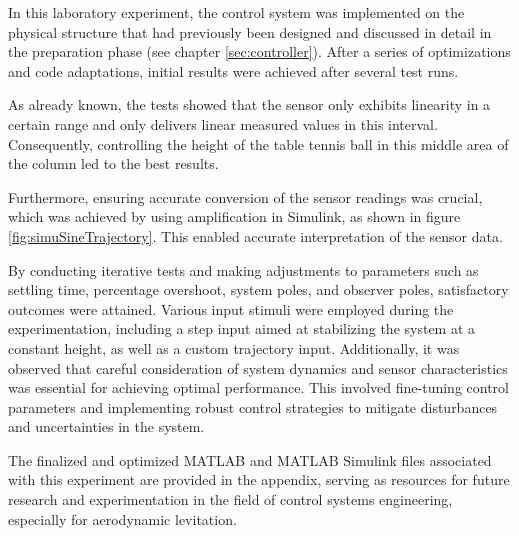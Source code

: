 

In this laboratory experiment, the control system was implemented on the physical structure that had previously been designed and discussed in detail in the preparation phase (see chapter \ref{sec:controller}). After a series of optimizations and code adaptations, initial results were achieved after several test runs.

As already known, the tests showed that the sensor only exhibits linearity in a certain range and only delivers linear measured values in this interval. Consequently, controlling the height of the table tennis ball in this middle area of the column led to the best results.

Furthermore, ensuring accurate conversion of the sensor readings was crucial, which was achieved by using amplification in Simulink, as shown in figure \ref{fig:simuSineTrajectory}. This enabled accurate interpretation of the sensor data.

By conducting iterative tests and making adjustments to parameters such as settling time, percentage overshoot, system poles, and observer poles, satisfactory outcomes were attained. Various input stimuli were employed during the experimentation, including a step input aimed at stabilizing the system at a constant height, as well as a custom trajectory input. 
Additionally, it was observed that careful consideration of system dynamics and sensor characteristics was essential for achieving optimal performance. This involved fine-tuning control parameters and implementing robust control strategies to mitigate disturbances and uncertainties in the system.

The finalized and optimized MATLAB and MATLAB Simulink files associated with this experiment are provided in the appendix, serving as  resources for future research and experimentation in the field of control systems engineering, especially for aerodynamic levitation. 


